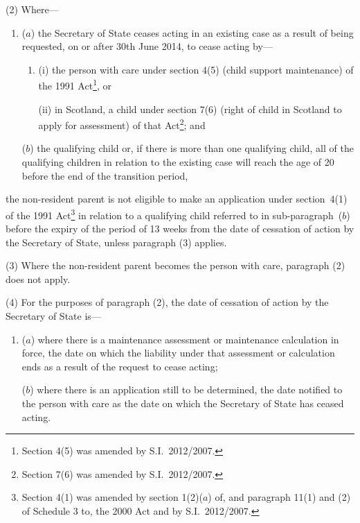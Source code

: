 \documentclass[12pt,a4paper]{article}
\begin{document}
(2) Where—
\begin{enumerate}\item[]
($a$) the Secretary of State ceases acting in an existing case as a result of being requested, on or after 30th June 2014, to cease acting by—
\begin{enumerate}\item[]
(i) the person with care under section 4(5) (child support maintenance) of the 1991 Act\footnote{Section 4(5) was amended by S.I.~2012/2007.}, or

(ii) in Scotland, a child under section 7(6) (right of child in Scotland to apply for assessment) of that Act\footnote{Section 7(6) was amended by S.I.~2012/2007.}; and
\end{enumerate}
($b$) the qualifying child or, if there is more than one qualifying child, all of the qualifying children in relation to the existing case will reach the age of 20 before the end of the transition period,
\end{enumerate}
the non-resident parent is not eligible to make an application under section~4(1) of the 1991 Act\footnote{Section 4(1) was amended by section 1(2)($a$)  of, and paragraph 11(1) and (2) of Schedule 3 to, the 2000 Act and by S.I.~2012/2007.} in relation to a qualifying child referred to in sub-paragraph~($b$)  before the expiry of the period of 13 weeks from the date of cessation of action by the Secretary of State, unless paragraph (3) applies.

(3) Where the non-resident parent becomes the person with care, paragraph (2) does not apply.

(4) For the purposes of paragraph (2), the date of cessation of action by the Secretary of State is—
\begin{enumerate}\item[]
($a$) where there is a maintenance assessment or maintenance calculation in force, the date on which the liability under that assessment or calculation ends as a result of the request to cease acting;

($b$) where there is an application still to be determined, the date notified to the person with care as the date on which the Secretary of State has ceased acting.
\end{enumerate}
\end{document}

